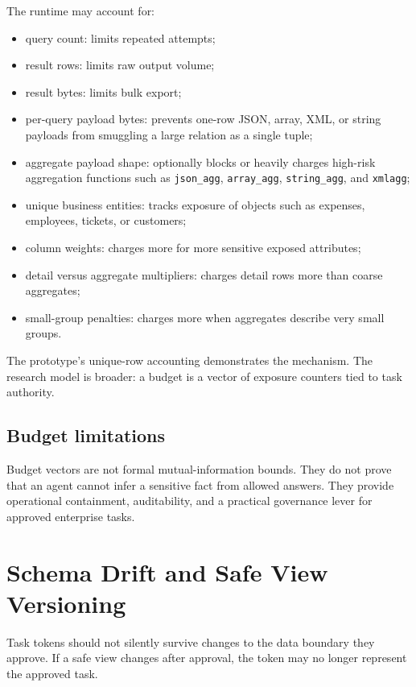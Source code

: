 \documentclass[journal]{IEEEtran}
\providecommand{\tightlist}{%
  \setlength{\itemsep}{0pt}\setlength{\parskip}{0pt}}
\begin{document}
The runtime may account for:

\begin{itemize}
\tightlist
\item
  query count: limits repeated attempts;
\item
  result rows: limits raw output volume;
\item
  result bytes: limits bulk export;
\item
  per-query payload bytes: prevents one-row JSON, array, XML,
  or string payloads from smuggling a large relation as a single tuple;
\item
  aggregate payload shape: optionally blocks or heavily charges
  high-risk aggregation functions such as \texttt{json\_agg},
  \texttt{array\_agg}, \texttt{string\_agg}, and \texttt{xmlagg};
\item
  unique business entities: tracks exposure of objects such as
  expenses, employees, tickets, or customers;
\item
  column weights: charges more for more sensitive exposed
  attributes;
\item
  detail versus aggregate multipliers: charges detail rows more
  than coarse aggregates;
\item
  small-group penalties: charges more when aggregates describe
  very small groups.
\end{itemize}

The prototype's unique-row accounting demonstrates the mechanism. The
research model is broader: a budget is a vector of exposure counters
tied to task authority.

\hypertarget{budget-limitations}{%
\subsection{Budget limitations}\label{budget-limitations}}

Budget vectors are not formal mutual-information bounds. They do not
prove that an agent cannot infer a sensitive fact from allowed answers.
They provide operational containment, auditability, and a practical
governance lever for approved enterprise tasks.


\hypertarget{schema-drift-and-safe-view-versioning}{%
\section{Schema Drift and Safe View
Versioning}\label{schema-drift-and-safe-view-versioning}}

Task tokens should not silently survive changes to the data boundary
they approve. If a safe view changes after approval, the token may no
longer represent the approved task.
\end{document}
